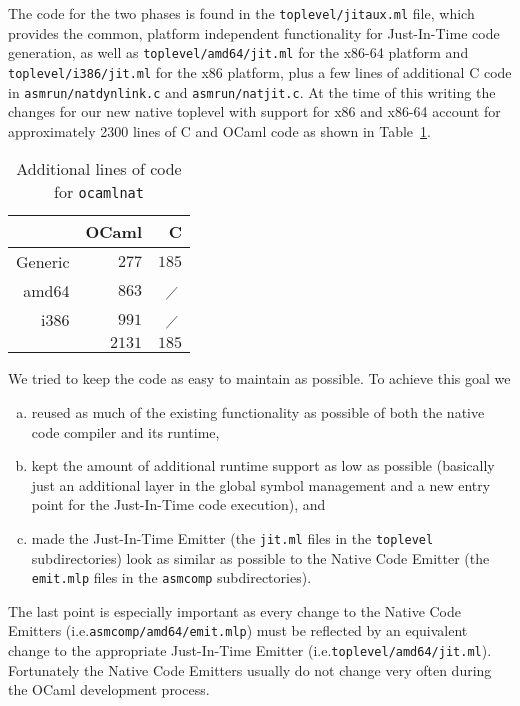 \documentclass[10pt,a4paper,draft,twocolumn]{article}
\makeatletter
\newcommand{\ie}{i.e.\@\xspace}
\makeatother
\begin{document}
The code for the two phases is found in the \texttt{toplevel/jitaux.ml} file, which provides the common, platform
independent functionality for Just-In-Time code generation, as well as \texttt{toplevel/amd64/jit.ml} for the x86-64
platform and \texttt{toplevel/i386/jit.ml} for the x86 platform, plus a few lines of additional C code in
\texttt{asmrun/natdynlink.c} and \texttt{asmrun/natjit.c}. At the time of this writing the changes for our
new native toplevel with support for x86 and x86-64 account for approximately 2300 lines of C and OCaml
code as shown in Table~\ref{tab:Additional_lines_of_code_for_ocamlnat}.

\begin{table}[htb]
  \centering
  \begin{tabular}{r|rr}
    & OCaml & C \\
    \hline
    Generic & $277$ & $185$ \\
    amd64 & $863$ & $\diagup$\, \\
    i386 & $991$ & $\diagup$\, \\
    \hline
    & $2131$ & $185$ \\
  \end{tabular}
  \caption{Additional lines of code for \texttt{ocamlnat}}
  \label{tab:Additional_lines_of_code_for_ocamlnat}
\end{table}

We tried to keep the code as easy to maintain as possible. To achieve this goal we
\begin{enumerate}[(a)]
\item reused as much of the existing functionality as possible of both the native code compiler and
  its runtime,
\item kept the amount of additional runtime support as low as possible (basically just an additional layer in
  the global symbol management and a new entry point for the Just-In-Time code execution), and
\item made the Just-In-Time Emitter (the \texttt{jit.ml} files in the \texttt{toplevel} subdirectories) look as
  similar as possible to the Native Code Emitter (the \texttt{emit.mlp} files in the \texttt{asmcomp}
  subdirectories).
\end{enumerate}
The last point is especially important as every change to the Native Code Emitters
(\ie \texttt{asmcomp/amd64/emit.mlp}) must be reflected by an equivalent change to the appropriate
Just-In-Time Emitter (\ie \texttt{toplevel/amd64/jit.ml}). Fortunately the Native Code Emitters usually
do not change very often during the OCaml development process.
\end{document}
